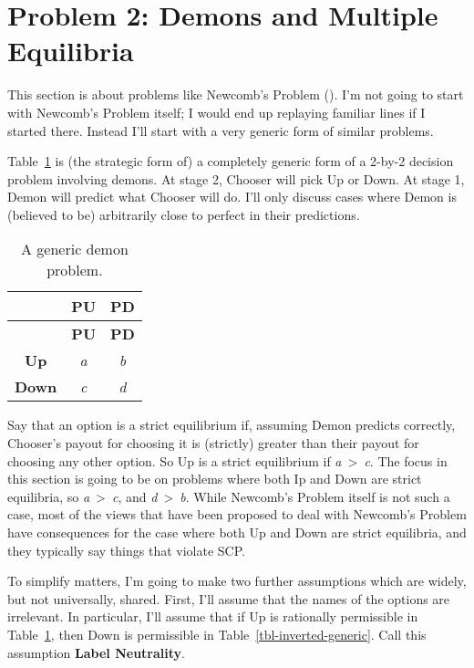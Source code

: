 \documentclass[
  10pt,
  letterpaper,
  DIV=11,
  numbers=noendperiod,
  twoside]{scrartcl}
\begin{document}
\section{Problem 2: Demons and Multiple Equilibria}\label{sec-multiple}

This section is about problems like Newcomb's Problem
(). I'm not going to start with
Newcomb's Problem itself; I would end up replaying familiar lines if I
started there. Instead I'll start with a very generic form of similar
problems.

Table~\ref{tbl-generic-demon} is (the strategic form of) a completely
generic form of a 2-by-2 decision problem involving demons. At stage 2,
Chooser will pick Up or Down. At stage 1, Demon will predict what
Chooser will do. I'll only discuss cases where Demon is (believed to be)
arbitrarily close to perfect in their predictions.

\begin{longtable}[]{@{}ccc@{}}
\caption{A generic demon
problem.}\label{tbl-generic-demon}\tabularnewline
\toprule\noalign{}
& \textbf{PU} & \textbf{PD} \\
\midrule\noalign{}
\endfirsthead
\toprule\noalign{}
& \textbf{PU} & \textbf{PD} \\
\midrule\noalign{}
\endhead
\bottomrule\noalign{}
\endlastfoot
\textbf{Up} & \emph{a} & \emph{b} \\
\textbf{Down} & \emph{c} & \emph{d} \\
\end{longtable}

Say that an option is a strict equilibrium if, assuming Demon predicts
correctly, Chooser's payout for choosing it is (strictly) greater than
their payout for choosing any other option. So Up is a strict
equilibrium if \emph{a}~\textgreater~\emph{c}. The focus in this section
is going to be on problems where both Ip and Down are strict equilibria,
so \emph{a}~\textgreater~\emph{c}, and \emph{d}~\textgreater~\emph{b}.
While Newcomb's Problem itself is not such a case, most of the views
that have been proposed to deal with Newcomb's Problem have consequences
for the case where both Up and Down are strict equilibria, and they
typically say things that violate SCP.

To simplify matters, I'm going to make two further assumptions which are
widely, but not universally, shared. First, I'll assume that the names
of the options are irrelevant. In particular, I'll assume that if Up is
rationally permissible in Table~\ref{tbl-generic-demon}, then Down is
permissible in Table~\ref{tbl-inverted-generic}. Call this assumption
\textbf{Label Neutrality}.
\end{document}
